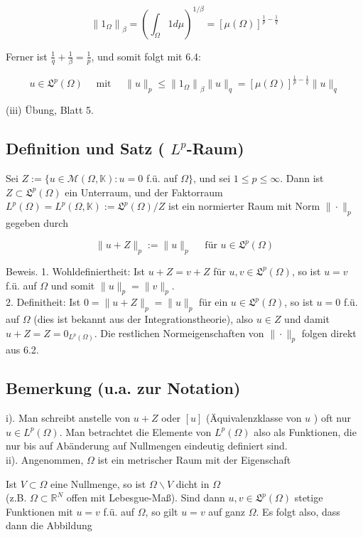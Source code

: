 \documentclass[10pt, letterpaper]{article}
\begin{document}
$$
\left\|1_{\Omega}\right\|_{\beta}=\left(\int_{\Omega} 1 d \mu\right)^{1 / \beta}=[\mu(\Omega)]^{\frac{1}{p}-\frac{1}{q}}
$$

Ferner ist $\frac{1}{q}+\frac{1}{\beta}=\frac{1}{p}$, und somit folgt mit 6.4:

$$
u \in \mathfrak{L}^{p}(\Omega) \quad \text { mit } \quad\|u\|_{p} \leq\left\|1_{\Omega}\right\|_{\beta}\|u\|_{q}=[\mu(\Omega)]^{\frac{1}{p}-\frac{1}{q}}\|u\|_{q}
$$

(iii) Übung, Blatt 5.

\subsection*{Definition und Satz ( $L^{p}$-Raum)}
Sei $Z:=\{u \in \mathcal{M}(\Omega, \mathbb{K}): u=0$ f.ü. auf $\Omega\}$, und sei $1 \leq p \leq \infty$. Dann ist $Z \subset \mathfrak{L}^{p}(\Omega)$ ein Unterraum, und der Faktorraum $L^{p}(\Omega)=L^{p}(\Omega, \mathbb{K}):=\mathfrak{L}^{p}(\Omega) / Z$ ist ein normierter Raum mit Norm $\|\cdot\|_{p}$ gegeben durch

$$
\|u+Z\|_{p}:=\|u\|_{p} \quad \text { für } u \in \mathfrak{L}^{p}(\Omega)
$$

Beweis. 1. Wohldefiniertheit: Ist $u+Z=v+Z$ für $u, v \in \mathfrak{L}^{p}(\Omega)$, so ist $u=v$ f.ü. auf $\Omega$ und somit $\|u\|_{p}=\|v\|_{p}$.\\
2. Definitheit: Ist $0=\|u+Z\|_{p}=\|u\|_{p}$ für ein $u \in \mathfrak{L}^{p}(\Omega)$, so ist $u=0$ f.ü. auf $\Omega$ (dies ist bekannt aus der Integrationstheorie), also $u \in Z$ und damit $u+Z=Z=0_{L^{p}(\Omega)}$. Die restlichen Normeigenschaften von $\|\cdot\|_{p}$ folgen direkt aus 6.2.

\subsection*{Bemerkung (u.a. zur Notation)}
i). Man schreibt anstelle von $u+Z$ oder $[u]$ (Äquivalenzklasse von $u$ ) oft nur $u \in L^{p}(\Omega)$. Man betrachtet die Elemente von $L^{p}(\Omega)$ also als Funktionen, die nur bis auf Abänderung auf Nullmengen eindeutig definiert sind.\\
ii). Angenommen, $\Omega$ ist ein metrischer Raum mit der Eigenschaft

Ist $V \subset \Omega$ eine Nullmenge, so ist $\Omega \backslash V$ dicht in $\Omega$\\
(z.B. $\Omega \subset \mathbb{R}^{N}$ offen mit Lebesgue-Maß). Sind dann $u, v \in \mathfrak{L}^{p}(\Omega)$ stetige Funktionen mit $u=v$ f.ü. auf $\Omega$, so gilt $u=v$ auf ganz $\Omega$. Es folgt also, dass dann die Abbildung
\end{document}
